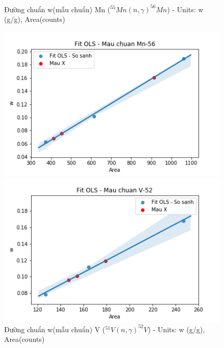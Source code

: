 
\begin{figure}
    \centering
    \begin{minipage}[htpb]{0.5\textwidth}
        \caption{Đường chuẩn w(mẫu chuẩn) Mn ($^{55}Mn (n,\gamma) ^{56}Mn$) - Units: w (g/g), Area(counts)}
        \includegraphics[width=\textwidth]{image/Mn.png}
    \end{minipage}
    \begin{minipage}[htpb]{0.5\textwidth}
        \caption{Đường chuẩn w(mẫu chuẩn) V ($^{51}V (n,\gamma) ^{52}V$) - Units: w (g/g), Area(counts)}
        \includegraphics[width=\textwidth]{image/V.png}
    \end{minipage}
\end{figure}